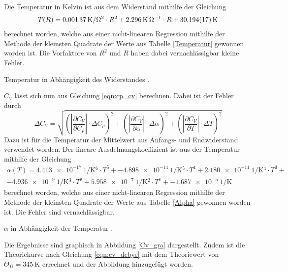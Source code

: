 Die Temperatur in Kelvin ist aus dem Widerstand mithilfe der Gleichung
\begin{equation*}
	T(R) = \SI{0.00137}{\kelvin\per\ohm^2} \cdot R^2 + \SI{2.296}{\kelvin\per\ohm} \cdot R + \SI{30.194 \pm 0.017}{\kelvin}
\end{equation*}
berechnet worden, welche aus einer nicht-linearen Regression mithilfe der Methode der kleinsten Quadrate der Werte aus Tabelle \ref{Temperatur} gewonnen worden ist.
Die Vorfaktore von $R^2$ und $R$ haben dabei vernachlässigbar kleine Fehler.

\begin{table}[!h]
	\centering
	\caption[]{Temperatur in Abhängigkeit des Widerstandes \cite{V47}.}
	
	\label{Temperatur}
\end{table}

$C_V$ lässt sich nun aus Gleichung \eqref{eqn:cp_cv} 
berechnen.
Dabei ist der Fehler durch
\begin{equation*}
	\Delta C_V = \sqrt{\left(|\frac{\partial C_V}{\partial C_p}|\cdot \Delta C_p \right)^2 + \left(|\frac{\partial C_V}{\partial \alpha}|\cdot \Delta \alpha \right)^2 + \left(|\frac{\partial C_V}{\partial T}|\cdot \Delta T \right)^2}
\end{equation*}
Dazu ist für die Temperatur der Mittelwert aus Anfangs- und Endwiderstand verwendet worden.
Der lineare Ausdehnungskoeffizient ist aus der Temperatur mithilfe der Gleichung
\begin{eqnarray*}
	\alpha(T) = 
	\SI{4.413 e-17}{1\per\kelvin^6} \cdot T^5 +
	\SI{-4.898 e-14}{1\per\kelvin^5} \cdot T^4 + 
	\SI{2.180 e-11}{1\per\kelvin^4} \cdot T^3 +\\ 
	\SI{-4.936 e-9}{1\per\kelvin^3}\cdot T^2 + 
	\SI{5.958 e-7}{1\per\kelvin^2} \cdot T^1 + 
	\SI{-1.687 e-5}{1\per\kelvin} 
\end{eqnarray*}
berechnet worden, welche aus einer nicht-linearen Regression mithilfe der Methode der kleinsten Quadrate der Werte aus Tabelle \ref{Alpha} gewonnen worden ist.
Die Fehler sind vernachlässigbar.

\begin{table}[!h]
	\centering
	\caption[]{$\alpha$ in Abhängigkeit der Temperatur \cite{V47}.}
	
	\label{Alpha}
\end{table}

Die Ergebnisse sind graphisch in Abbildung \ref{Cv_gra} dargestellt.
Zudem ist die Theoriekurve nach Gleichung \eqref{eqn:cv_debye} mit dem Theoriewert von $\Theta_D = \SI{345}{\kelvin}$ \cite{kupfer3} errechnet und der Abbildung hinzugefügt worden.

